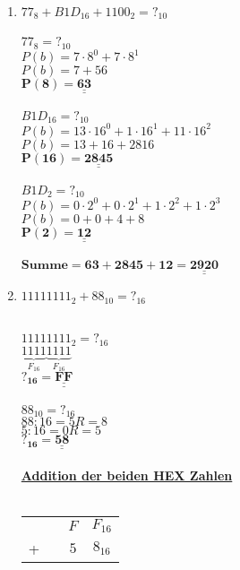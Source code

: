 \documentclass[a4paper,10pt]{article}
\def\doubleunderline#1{\underline{\underline{#1}}}
\begin{document}
\begin{enumerate}
\item $77_{8} + B1D_{16} + 1100_{2} = ?_{10}$ \\ \\ %
	 {\color{ForestGreen}
	 	 $77_{8} = ?_{10}$ \\
		 $P(b)= 7 \cdot 8^0 + 7 \cdot 8^1$ \\
		 $P(b)= 7 + 56 $ \\
		 $\mathbf{P(8)= \doubleunderline{63}}$ \\
		 \\
	 	 $B1D_{16} = ?_{10}$ \\
		 $P(b)= 13 \cdot 16^0 + 1 \cdot 16^1 + 11 \cdot 16^2$ \\
		 $P(b)= 13 + 16 + 2816 $ \\
		 $\mathbf{P(16)= \doubleunderline{2845}}$ \\	
		 \\
	 	 $B1D_{2} = ?_{10}$ \\
		 $P(b)= 0 \cdot 2^0 + 0 \cdot 2^1 + 1 \cdot 2^2 + 1 \cdot 2^3$ \\
		 $P(b)= 0 + 0 + 4 + 8 $ \\
		 $\mathbf{P(2)= \doubleunderline{12}}$ \\		
		 \\
		 $\mathbf{Summe = 63 + 2845 + 12 = \doubleunderline{2920}}$ 
	 }
\item $11111111_{2} + 88_{10} = ?_{16}$  \\     \\    %
	 {\color{ForestGreen}
	 	 $11111111_{2} = ?_{16}$ \\
		 $\underbrace{1111}_\text{$F_{16}$}\underbrace{1111}_\text{$F_{16}$}$ \\
		 $\mathbf{?_{16} = \doubleunderline{FF}}$ \\
		 \\
		 $88_{10} = ?_{16}$ \\
		 $88 : 16 = 5 R=8$  \\
		 $5 : 16 = 0 R=5$ \\
		 $\mathbf{?_{16} = \doubleunderline{58}}$ \\
		 \\
		 \textbf{\underline{Addition der beiden HEX Zahlen}} \\
		 \\
		 \begin{tabular}{c@{\,}c@{\,}c@{\,}c}
		  &  & $F$ & $F_{16}$ \\
		+ &   & $5$ & $8_{16}$ \\

\end{tabular}}
\end{enumerate}
\end{document}
